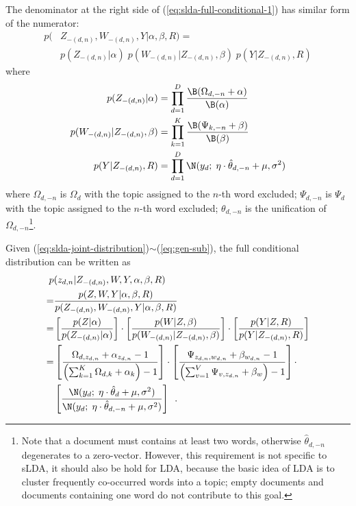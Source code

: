 The denominator at the right side of
(\ref{eq:slda-full-conditional-1}) has similar form of the numerator:
\begin{equation}
  \label{eq:slda-sub-joint-distribution}
  \begin{split}
    p(&Z_{-(d,n)},W_{-(d,n)},Y|\alpha,\beta,R) = \\
    &p(Z_{-(d,n)}|\alpha) \; p(W_{-(d,n)}|Z_{-(d,n)},\beta) \; p(Y|Z_{-(d,n)},R)
  \end{split}
\end{equation}
where
\begin{equation}
  \label{eq:gen-sub}
  \begin{split}
  p(Z_{-(d,n)}|\alpha)
  &=
  \prod_{d=1}^D
  \frac{\B(\Omega_{d,-n}+\alpha)}{\B(\alpha)}
  \\
  p(W_{-(d,n)}|Z_{-(d,n)},\beta)
  &=
  \prod_{k=1}^K
  \frac{\B(\Psi_{k,-n}+\beta)}{\B(\beta)}
  \\
  p(Y|Z_{-(d,n)},R)
  &=
  \prod_{d=1}^D \N(y_d; \; \eta \cdot \hat{\theta}_{d,-n} + \mu, \sigma^2)
  \end{split}
\end{equation}
where $\Omega_{d,-n}$ is $\Omega_{d}$ with the topic assigned to the
$n$-th word excluded; $\Psi_{d,-n}$ is $\Psi_d$ with the topic
assigned to the $n$-th word excluded; $\theta_{d,-n}$ is the
unification of $\Omega_{d,-n}$\footnote{Note that a document must
  contains at least two words, otherwise $\hat{\theta}_{d,-n}$
  degenerates to a zero-vector.  However, this requirement is not
  specific to sLDA, it should also be hold for LDA, because the basic
  idea of LDA is to cluster frequently co-occurred words into a topic;
  empty documents and documents containing one word do not contribute
  to this goal.}.

Given (\ref{eq:slda-joint-distribution})$\sim$(\ref{eq:gen-sub}), the
full conditional distribution can be written as
\begin{equation}
  \label{eq:slda-full-conditional-1}
  \begin{split}
  p&(z_{d,n}|Z_{-(d,n)},W,Y,\alpha,\beta,R)
  \\
  =&
  \frac{
    p(Z,W,Y|\alpha,\beta,R)
  }{
    p(Z_{-(d,n)},W_{-(d,n)},Y|\alpha,\beta,R)
  }
  \\
  =&
  \left[ \frac{p(Z|\alpha)}{p(Z_{-(d,n)}|\alpha)} \right] \cdot
  \left[ \frac{p(W|Z,\beta)}{p(W_{-(d,n)}|Z_{-(d,n)},\beta)} \right] \cdot
  \left[ \frac{p(Y|Z,R)}{p(Y|Z_{-(d,n)},R)} \right]
  \\
  =&
  \left[ \frac{
    \Omega_{d,z_{d,n}} + \alpha_{z_{d,n}} - 1
  }{
    \left( \sum_{k=1}^K  \Omega_{d,k} + \alpha_k \right) - 1
  } \right]
  \cdot
  \left[ \frac{
    \Psi_{z_{d,n},w_{d,n}} + \beta_{w_{d,n}} - 1
  }{
    \left( \sum_{v=1}^V  \Psi_{v,z_{d,n}} + \beta_w \right) - 1
  } \right]
  \cdot
  \\
  &
  \left[ \frac{
    \N(y_d; \; \eta \cdot \hat{\theta}_d + \mu, \sigma^2)
  }{
    \N(y_d; \; \eta \cdot \hat{\theta}_{d,-n} + \mu, \sigma^2)
  } \right]
  \enspace.
  \end{split}
\end{equation}

